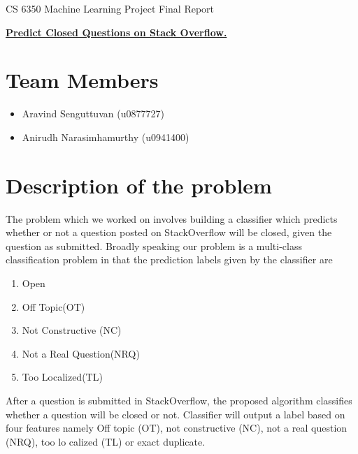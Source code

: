 \documentclass[11pt]{exam}
\begin{document}
\begingroup
\fontsize{14pt}{16pt}\selectfont
\begin{center}  
CS 6350 Machine Learning Project Final Report \\

\end{center}  

\begin{center}
\textbf{\underline{ Predict Closed Questions on Stack Overflow.}
}
\end{center}
\endgroup
%
%



\section{Team Members}

\begin{itemize}
	\item Aravind Senguttuvan (u0877727)
	\item Anirudh Narasimhamurthy (u0941400)
\end{itemize}


\section{Description of the problem}

The problem which we worked on involves building  a classifier which predicts whether or not a question posted on StackOverflow will be closed, given the question as submitted. Broadly speaking our problem is a multi-class classification problem in that the prediction labels given by the classifier are 
\begin{enumerate}
	\item Open
	\item Off Topic(OT)
	\item Not Constructive (NC)
	\item Not a Real Question(NRQ)
	\item Too Localized(TL)
\end{enumerate}

After a question is submitted in StackOverflow, the proposed algorithm classifies whether a question will be closed or not. Classifier will output a label based on four features namely  Off topic (OT), not constructive (NC), not a real question (NRQ), too lo
calized (TL) or exact duplicate.  
\end{document}
